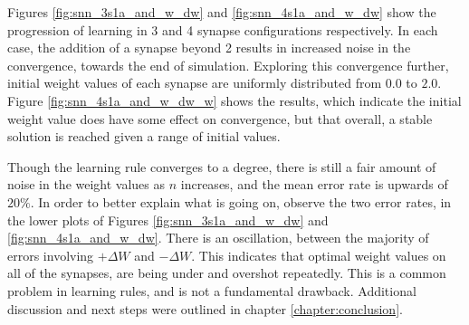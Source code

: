 

Figures \ref{fig:snn_3s1a_and_w_dw} and \ref{fig:snn_4s1a_and_w_dw} show the
progression of learning in 3 and 4 synapse configurations respectively. In each
case, the addition of a synapse beyond 2 results in increased noise in the
convergence, towards the end of simulation. Exploring this convergence further,
initial weight values of each synapse are uniformly distributed from $0.0$ to
$2.0$. Figure \ref{fig:snn_4s1a_and_w_dw_w} shows the results, which indicate
the initial weight value does have some effect on convergence, but that overall,
a stable solution is reached given a range of initial values.


Though the learning rule converges to a degree, there is still a fair amount of
noise in the weight values as $n$ increases, and the mean error rate is upwards
of $20\%$. In order to better explain what is going on, observe the two error
rates, in the lower plots of Figures \ref{fig:snn_3s1a_and_w_dw} and
\ref{fig:snn_4s1a_and_w_dw}. There is an oscillation, between the majority of
errors involving $+\Delta W$ and $-\Delta W$. This indicates that optimal weight
values on all of the synapses, are being under and overshot repeatedly. This is
a common problem in learning rules, and is not a fundamental
drawback. Additional discussion and next steps were outlined in chapter
\ref{chapter:conclusion}.

